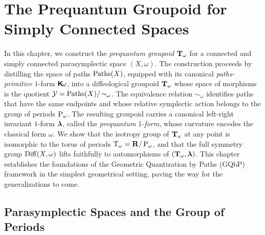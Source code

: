 \documentclass[10pt,reqno,letterpaper,twoside]{amsbook}
\begin{document}
  
  
  \chapter{The Prequantum Groupoid for Simply Connected Spaces}
  \label{chap:The Prequantum Groupoid for Simply Connected Spaces}
  
  In this chapter,
  we construct the \emph{prequantum groupoid} $\mathbf{T}_\omega$ for a connected and simply connected parasymplectic space $(X,\omega)$.
  The construction proceeds by distilling the space of paths $\operatorname{Paths}(X)$,
  equipped with its canonical \emph{paths-primitive} $1$-form $\boldsymbol{\mathsf{K}}\!\omega$,
  into a diffeological groupoid $\mathbf{T}_\omega$ whose space of morphisms is the quotient $\mathcal{Y} = \operatorname{Paths}(X)/\!\sim_\omega$.
  The equivalence relation $\sim_\omega$ identifies paths that have the same endpoints and whose relative symplectic action belongs to the group of periods $\operatorname{P}_\omega$.
  The resulting groupoid carries a canonical left-right invariant $1$-form $\boldsymbol \lambda$,
  called the \emph{prequantum $1$-form},
  whose curvature encodes the classical form $\omega$.
  We show that the isotropy group of $\mathbf{T}_\omega$ at any point is isomorphic to the torus of periods $\mathrm{T}_\omega = {\mathbf{R}}/\operatorname{P}_\omega$,
  and that the full symmetry group $\operatorname{Diff}(X,\omega)$ lifts faithfully to automorphisms of $(\mathbf{T}_\omega,\boldsymbol \lambda)$.
  This chapter establishes the foundations of the Geometric Quantization by Paths (GQbP) framework
  in the simplest geometrical setting,
  paving the way for the generalizations to come.
  
  \section{Parasymplectic Spaces and the Group of Periods}
  \label{sec:Parasymplectic Spaces and the Group of Periods}
  
\end{document}
